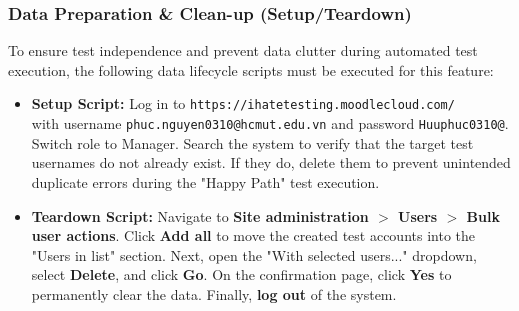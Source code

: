 \documentclass[twoside,final]{hcmut-report}
\begin{document}
\subsubsection{Data Preparation \& Clean-up (Setup/Teardown)}
To ensure test independence and prevent data clutter during automated test execution, the following data lifecycle scripts must be executed for this feature:
\begin{itemize}
    \item \textbf{Setup Script:} Log in to \texttt{https://ihatetesting.moodlecloud.com/}\\ with username \texttt{phuc.nguyen0310@hcmut.edu.vn} and password \texttt{Huuphuc0310@}. Switch role to Manager. Search the system to verify that the target test usernames do not already exist. If they do, delete them to prevent unintended duplicate errors during the "Happy Path" test execution.
    \item \textbf{Teardown Script:} Navigate to \textbf{Site administration $>$ Users $>$ Bulk user actions}. Click \textbf{Add all} to move the created test accounts into the "Users in list" section. Next, open the "With selected users..." dropdown, select \textbf{Delete}, and click \textbf{Go}. On the confirmation page, click \textbf{Yes} to permanently clear the data. Finally, \textbf{log out} of the system.
\end{itemize}
\end{document}
